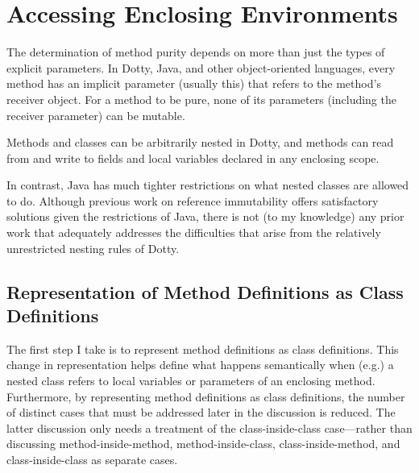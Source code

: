 \section{Accessing Enclosing Environments}

The determination of method purity depends on more than just the types of explicit parameters. In Dotty, Java, and other object-oriented languages, every method has an implicit parameter (usually {\cd this}) that refers to the method's receiver object. For a method to be pure, none of its parameters (including the receiver parameter) can be mutable.

Methods and classes can be arbitrarily nested in Dotty, and methods can read from and write to fields and local variables declared in any enclosing scope.

In contrast, Java has much tighter restrictions on what nested classes are allowed to do. Although previous work on reference immutability offers satisfactory solutions given the restrictions of Java, there is not (to my knowledge) any prior work that adequately addresses the difficulties that arise from the relatively unrestricted nesting rules of Dotty.



\begin{comment}
2. traits have uniquely-named outer-reference fields.
3. methods are defined as classes (logic goes in the constructor, locals become fields,)
4. calls to methods become pairs of construct / field read.
5. the `this' read becomes a read of an outer field
6. construction of classes involves passing the outer reference as a param
Order of transformation: Innermost methods first?
\end{comment}

\subsection{Representation of Method Definitions as Class Definitions}

The first step I take is to represent method definitions as class definitions. This change in representation helps define what happens semantically when (e.g.) a nested class refers to local variables or parameters of an enclosing method. Furthermore, by representing method definitions as class definitions, the number of distinct cases that must be addressed later in the discussion is reduced. The latter discussion only needs a treatment of the class-inside-class case---rather than discussing method-inside-method, method-inside-class, class-inside-method, and class-inside-class as separate cases.

